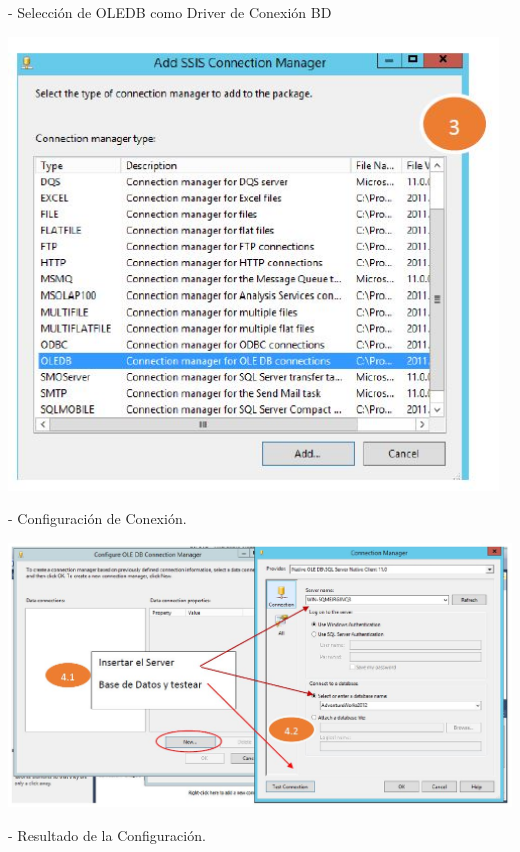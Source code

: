 - Selección de OLEDB como Driver de Conexión BD

	\begin{center}
	\includegraphics[width=13cm]{./Imagenes/12}
	\end{center}	

- Configuración de Conexión.

	\begin{center}
	\includegraphics[width=17cm]{./Imagenes/13}
	\end{center}	

- Resultado de la Configuración.

